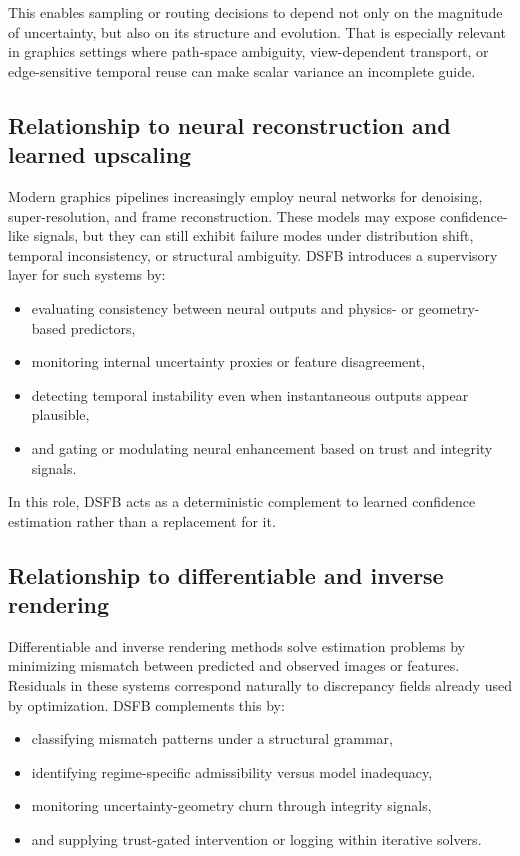\documentclass[11pt]{article}
\theoremstyle{definition}
\theoremstyle{plain}
\begin{document}
This enables sampling or routing decisions to depend not only on the magnitude of uncertainty, but also on its structure and evolution. That is especially relevant in graphics settings where path-space ambiguity, view-dependent transport, or edge-sensitive temporal reuse can make scalar variance an incomplete guide. 


\subsection{Relationship to neural reconstruction and learned upscaling}

Modern graphics pipelines increasingly employ neural networks for denoising, super-resolution, and frame reconstruction. These models may expose confidence-like signals, but they can still exhibit failure modes under distribution shift, temporal inconsistency, or structural ambiguity. DSFB introduces a supervisory layer for such systems by:
\begin{itemize}[leftmargin=1.5em]
    \item evaluating consistency between neural outputs and physics- or geometry-based predictors,
    \item monitoring internal uncertainty proxies or feature disagreement,
    \item detecting temporal instability even when instantaneous outputs appear plausible,
    \item and gating or modulating neural enhancement based on trust and integrity signals.
\end{itemize}

In this role, DSFB acts as a deterministic complement to learned confidence estimation rather than a replacement for it.


\subsection{Relationship to differentiable and inverse rendering}

Differentiable and inverse rendering methods solve estimation problems by minimizing mismatch between predicted and observed images or features. Residuals in these systems correspond naturally to discrepancy fields already used by optimization. DSFB complements this by:
\begin{itemize}[leftmargin=1.5em]
    \item classifying mismatch patterns under a structural grammar,
    \item identifying regime-specific admissibility versus model inadequacy,
    \item monitoring uncertainty-geometry churn through integrity signals,
    \item and supplying trust-gated intervention or logging within iterative solvers.
\end{itemize}
\end{document}
